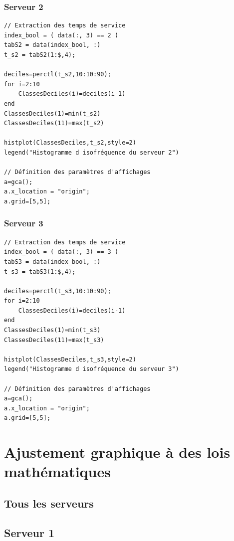 \documentclass{article}
\begin{document}
\subsubsection{Serveur 2}
\begin{verbatim}
// Extraction des temps de service
index_bool = ( data(:, 3) == 2 )
tabS2 = data(index_bool, :)
t_s2 = tabS2(1:$,4);

deciles=perctl(t_s2,10:10:90);
for i=2:10
    ClassesDeciles(i)=deciles(i-1)
end
ClassesDeciles(1)=min(t_s2)
ClassesDeciles(11)=max(t_s2)

histplot(ClassesDeciles,t_s2,style=2)
legend("Histogramme d isofréquence du serveur 2")

// Définition des paramètres d'affichages
a=gca();
a.x_location = "origin";
a.grid=[5,5];
\end{verbatim}

\subsubsection{Serveur 3}
\begin{verbatim}
// Extraction des temps de service
index_bool = ( data(:, 3) == 3 )
tabS3 = data(index_bool, :)
t_s3 = tabS3(1:$,4);

deciles=perctl(t_s3,10:10:90);
for i=2:10
    ClassesDeciles(i)=deciles(i-1)
end
ClassesDeciles(1)=min(t_s3)
ClassesDeciles(11)=max(t_s3)

histplot(ClassesDeciles,t_s3,style=2)
legend("Histogramme d isofréquence du serveur 3")

// Définition des paramètres d'affichages
a=gca();
a.x_location = "origin";
a.grid=[5,5];
\end{verbatim}

\section{Ajustement graphique à des lois mathématiques}

\subsection{Tous les serveurs}

\subsection{Serveur 1}
\end{document}
